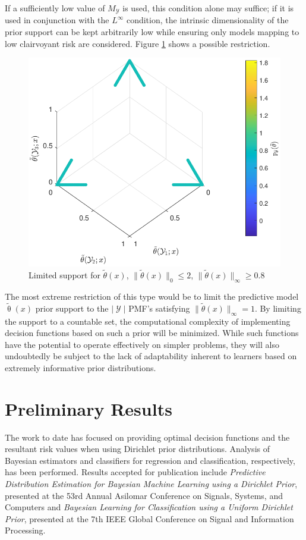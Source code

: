 \documentclass[12pt]{article}
\DeclareMathOperator{\Ycal}{\mathcal{Y}}
\begin{document}
If a sufficiently low value of $M_{\Ycal}$ is used, this condition alone may suffice; if it is used in conjunction with the $L^{\infty}$ condition, the intrinsic dimensionality of the prior support can be kept arbitrarily low while ensuring only models mapping to low clairvoyant risk are considered. Figure \ref{fig:theta_tilde_L0-inf} shows a possible restriction.
\begin{figure}
\centering
\includegraphics[width=0.6\linewidth]{theta_tilde_L0-inf.pdf}
\caption{Limited support for $\tilde{\theta}(x)$, $\big\| \tilde{\theta}(x) \big\|_0 \leq 2$, $\big\| \tilde{\theta}(x) \big\|_{\infty} \geq 0.8$}
\label{fig:theta_tilde_L0-inf}
\end{figure}

The most extreme restriction of this type would be to limit the predictive model $\tilde{\uptheta}(x)$ prior support to the $|\Ycal|$ PMF's satisfying $\big\| \tilde{\theta}(x) \big\|_{\infty} = 1$. By limiting the support to a countable set, the computational complexity of implementing decision functions based on such a prior will be minimized. While such functions have the potential to operate effectively on simpler problems, they will also undoubtedly be subject to the lack of adaptability inherent to learners based on extremely informative prior distributions. 












\newpage
\section{Preliminary Results} \label{sec:results}

The work to date has focused on providing optimal decision functions and the resultant risk values when using Dirichlet prior distributions. Analysis of Bayesian estimators and classifiers for regression and classification, respectively, has been performed. Results accepted for publication include \emph{Predictive Distribution Estimation for Bayesian Machine Learning using a Dirichlet Prior}, presented at the 53rd Annual Asilomar Conference on Signals, Systems, and Computers and \emph{Bayesian Learning for Classification using a Uniform Dirichlet Prior}, presented at the 7th IEEE Global Conference on Signal and Information Processing.
\end{document}
